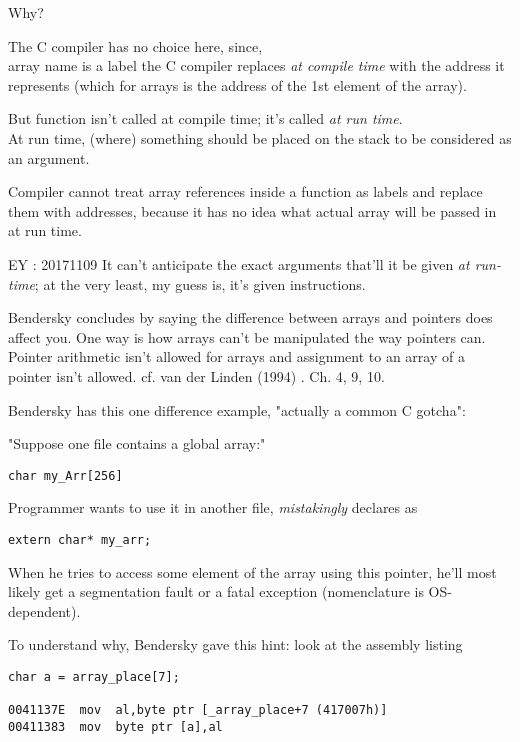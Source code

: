 \documentclass[10pt]{amsart}
\begin{document}
\begin{multicols*}{2}
Why?  

The C compiler has no choice here, since, \\
array name is a label the C compiler replaces \emph{at compile time}  with the address it represents (which for arrays is the address of the 1st element of the array).  

But function isn't called at compile time; it's called \emph{at run time}.  \\
At run time, (where) something should be placed on the stack to be considered as an argument.  

Compiler cannot treat array references inside a function as labels and replace them with addresses, because it has no idea what actual array will be passed in at run time.  

EY : 20171109 It can't anticipate the exact arguments that'll it be given \emph{at run-time}; at the very least, my guess is, it's given instructions.  

Bendersky \cite{Bend} concludes by saying the difference between arrays and pointers does affect you.  One way is how arrays can't be manipulated the way pointers can.  Pointer arithmetic isn't allowed for arrays and assignment to an array of a pointer isn't allowed.  cf. van der Linden (1994) \cite{Vand1994}. Ch. 4, 9, 10.  

Bendersky \cite{Bend} has this one difference example, "actually a common C gotcha":  

"Suppose one file contains a global array:"  

\begin{lstlisting}
char my_Arr[256]  
\end{lstlisting}

Programmer wants to use it in another file, \emph{mistakingly} declares as  
\begin{lstlisting}
extern char* my_arr; 
\end{lstlisting}

When he tries to access some element of the array using this pointer, he'll most likely get a segmentation fault or a fatal exception (nomenclature is OS-dependent).  

To understand why, Bendersky \cite{Bend} gave this hint:  look at the assembly listing  

\begin{lstlisting}
char a = array_place[7];

0041137E  mov  al,byte ptr [_array_place+7 (417007h)]
00411383  mov  byte ptr [a],al


\end{lstlisting}
\end{multicols*}
\end{document}
